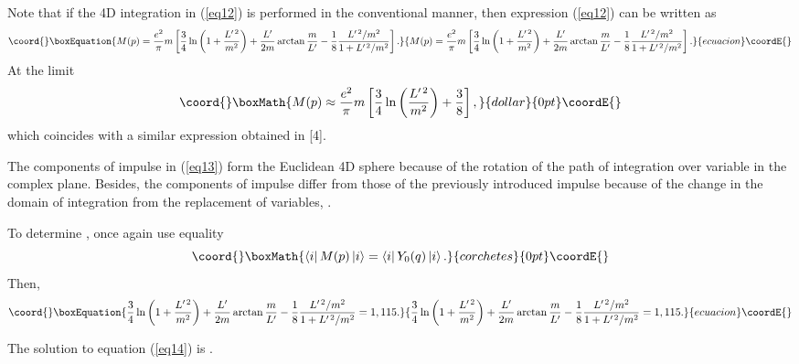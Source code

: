 \documentclass[a4paper,draft,showpacs,preprint,prd,aps]{revtex4}
\begin{document}
Note that if the 4D integration in (\ref{eq12}) is performed in the
conventional
manner, then expression (\ref{eq12}) can be written as
\begin{equation}\coord{}\boxEquation{
\label{eq13}
M(p) = \frac{e^2}{\pi}m\left[\frac 34\ln\left(1 + \frac{L^{\prime\,2}}
{m^2}\right) + \frac{L^\prime}{2m}\arctan\frac m{L^\prime} -
\frac 18\frac{L^{\prime\,2}/m^2}{1 + L^{\prime\,2}/m^2}
\right].
}{
M(p) = \frac{e^2}{\pi}m\left[\frac 34\ln\left(1 + \frac{L^{\prime\,2}}
{m^2}\right) + \frac{L^\prime}{2m}\arctan\frac m{L^\prime} -
\frac 18\frac{L^{\prime\,2}/m^2}{1 + L^{\prime\,2}/m^2}
\right].
}{ecuacion}\coordE{}\end{equation}
At the limit \coordHE{}  $$\coord{}\boxMath{
M(p) \approx \frac{e^2}\pi m\left[\frac 34
\ln\left(\frac{L^{\prime\,2}}{m^2}\right) + \frac 38 \right],
}{dollar}{0pt}\coordE{}$$
which coincides with a similar expression obtained in [4].

The components of impulse \coordHE{} in (\ref{eq13}) form the Euclidean 4D
sphere \coordHE{}
because of the rotation of the path of integration over variable \coordHE{}
in the complex plane. Besides, the components of impulse \coordHE{} differ
from
those of the previously introduced impulse \coordHE{} because of the change in the
domain of integration from the replacement of variables, \coordHE{}
\cite{ref4}.

To determine \coordHE{}, once again use equality
\[\coord{}\boxMath{
\left\langle i \right|M(p)\left| i \right\rangle =
\left\langle i \right|Y_0(q)\left| i \right\rangle .
}{corchetes}{0pt}\coordE{}\]
Then,
\begin{equation}\coord{}\boxEquation{
\label{eq14}
\frac 34\ln\left(1 + \frac{L^{\prime\,2}}{m^2}\right) +
\frac{L^\prime}{2m}\arctan\frac m{L^\prime} -
\frac 18\frac{L^{\prime\,2}/m^2}
{1 + L^{\prime\,2}/m^2} = 1,115.
}{
\frac 34\ln\left(1 + \frac{L^{\prime\,2}}{m^2}\right) +
\frac{L^\prime}{2m}\arctan\frac m{L^\prime} -
\frac 18\frac{L^{\prime\,2}/m^2}
{1 + L^{\prime\,2}/m^2} = 1,115.
}{ecuacion}\coordE{}\end{equation}

The solution to equation (\ref{eq14}) is \coordHE{}.
\end{document}
